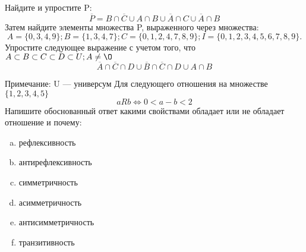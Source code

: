 \documentclass[10pt]{exam}
\begin{document}
\begin{questions}
\question
Найдите и упростите P:
\begin{equation*}
\overline{P} = B \cap \overline{C} \cup A \cap B \cup \overline{A} \cap C \cup \overline{A} \cap B
\end{equation*}
Затем найдите элементы множества P, выраженного через множества:
\begin{equation*}
A = \{0, 3, 4, 9\}; 
B = \{1, 3, 4, 7\};
C = \{0, 1, 2, 4, 7, 8, 9\};
I = \{0, 1, 2, 3, 4, 5, 6, 7, 8, 9\}.
\end{equation*}\question
Упростите следующее выражение с учетом того, что $A\subset B \subset C \subset D \subset U; A \neq \O$
\begin{equation*}
\overline{A} \cap \overline{C} \cap D \cup \overline{B} \cap \overline{C} \cap D \cup A \cap B
\end{equation*}

Примечание: U — универсум\question
Для следующего отношения на множестве $\{1, 2, 3, 4, 5\}$ 
\begin{equation*}
aRb \iff 0 < a-b<2
\end{equation*}
Напишите обоснованный ответ какими свойствами обладает или не обладает отношение и почему:   
\begin{enumerate} [a)]\setcounter{enumi}{0}
\item рефлексивность
\item антирефлексивность
\item симметричность
\item асимметричность
\item антисимметричность
\item транзитивность
\end{enumerate}


\end{questions}
\end{document}
